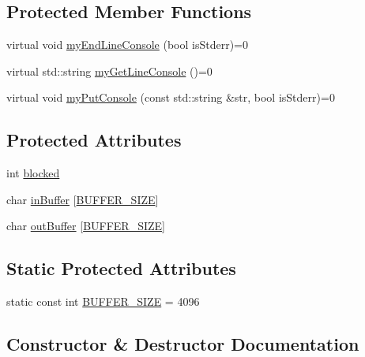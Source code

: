 \subsection*{Protected Member Functions}
\begin{DoxyCompactItemize}
\item 
virtual void \mbox{\hyperlink{classsgl_1_1ConsoleStreambuf_a783b4396763512a17fb6e825df868c16}{my\+End\+Line\+Console}} (bool is\+Stderr)=0
\item 
virtual std\+::string \mbox{\hyperlink{classsgl_1_1ConsoleStreambuf_a72b9cdcc2c68caf7acef81651071a14f}{my\+Get\+Line\+Console}} ()=0
\item 
virtual void \mbox{\hyperlink{classsgl_1_1ConsoleStreambuf_a090e9d08f0bd2092bf352d419bdd2a15}{my\+Put\+Console}} (const std\+::string \&str, bool is\+Stderr)=0
\end{DoxyCompactItemize}
\subsection*{Protected Attributes}
\begin{DoxyCompactItemize}
\item 
int \mbox{\hyperlink{classsgl_1_1ConsoleStreambuf_ac74e3d5a1b1eeb5c8e32867ad62823f0}{blocked}}
\item 
char \mbox{\hyperlink{classsgl_1_1ConsoleStreambuf_a6dfeba2ed7f89c327dd07f6136b2a256}{in\+Buffer}} \mbox{[}\mbox{\hyperlink{classsgl_1_1ConsoleStreambuf_a91f806c1bc7c1f4f402a627773840252}{B\+U\+F\+F\+E\+R\+\_\+\+S\+I\+ZE}}\mbox{]}
\item 
char \mbox{\hyperlink{classsgl_1_1ConsoleStreambuf_a015231cbe2f7737eee637ddee666f1dd}{out\+Buffer}} \mbox{[}\mbox{\hyperlink{classsgl_1_1ConsoleStreambuf_a91f806c1bc7c1f4f402a627773840252}{B\+U\+F\+F\+E\+R\+\_\+\+S\+I\+ZE}}\mbox{]}
\end{DoxyCompactItemize}
\subsection*{Static Protected Attributes}
\begin{DoxyCompactItemize}
\item 
static const int \mbox{\hyperlink{classsgl_1_1ConsoleStreambuf_a91f806c1bc7c1f4f402a627773840252}{B\+U\+F\+F\+E\+R\+\_\+\+S\+I\+ZE}} = 4096
\end{DoxyCompactItemize}


\subsection{Constructor \& Destructor Documentation}
\mbox{\label{classsgl_1_1ConsoleStreambuf_a00319cc8035be74bbc3bb63d60b8c8da}} 

